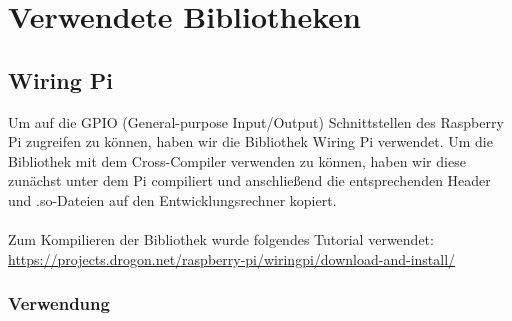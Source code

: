 \section{Verwendete Bibliotheken}

\subsection{Wiring Pi}

Um auf die GPIO (General-purpose Input/Output) Schnittstellen des Raspberry Pi zugreifen zu können, haben wir die Bibliothek Wiring Pi verwendet. Um die Bibliothek mit dem Cross-Compiler verwenden zu können, haben wir diese zunächst unter dem Pi compiliert und anschließend die entsprechenden Header und .so-Dateien auf den Entwicklungsrechner kopiert.\\
\\
Zum Kompilieren der Bibliothek wurde folgendes Tutorial verwendet:\\
\hyperlink{https://projects.drogon.net/raspberry-pi/wiringpi/download-and-install/}{https://projects.drogon.net/raspberry-pi/wiringpi/download-and-install/}
\subsubsection{Verwendung}

